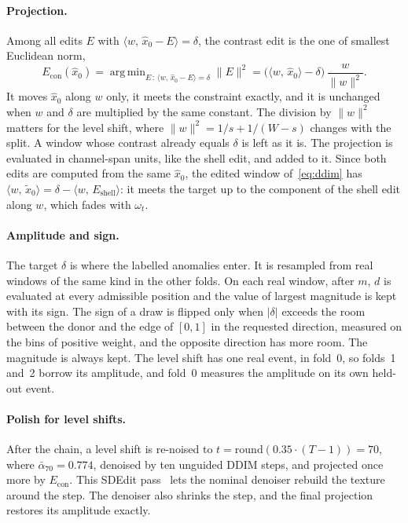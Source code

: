 \documentclass[11pt,a4paper]{article}
\newcommand{\xhat}{\hat{x}_{0}}            %
\newcommand{\xtil}{\tilde{x}_{0}}          %
\newcommand{\abar}{\bar\alpha}
\newcommand{\Eshell}{E_{\mathrm{shell}}}
\newcommand{\Econ}{E_{\mathrm{con}}}
\newcommand{\norm}[1]{\lVert #1 \rVert}
\newcommand{\inner}[2]{\langle #1,\, #2 \rangle}
\DeclareMathOperator*{\argmin}{arg\,min}
\begin{document}
\paragraph{Projection.}
Among all edits $E$ with $\inner{w}{\xhat - E} = \delta$, the contrast edit is
the one of smallest Euclidean norm,
\begin{equation}
\label{eq:contrast}
\Econ(\xhat)
  = \argmin_{E \,:\, \inner{w}{\xhat - E} = \delta} \norm{E}^{2}
  = \bigl(\inner{w}{\xhat} - \delta\bigr)\,
    \frac{w}{\norm{w}^{2}}.
\end{equation}
It moves $\xhat$ along $w$ only, it meets the constraint exactly, and it is
unchanged when $w$ and $\delta$ are multiplied by the same constant. The
division by $\norm{w}^{2}$ matters for the level shift, where
$\norm{w}^{2} = 1/s + 1/(W-s)$ changes with the split. A window whose contrast
already equals $\delta$ is left as it is. The projection is evaluated in
channel-span units, like the shell edit, and added to it. Since both edits are
computed from the same $\xhat$, the edited window of~\eqref{eq:ddim} has
$\inner{w}{\xtil} = \delta - \inner{w}{\Eshell}$: it meets the target up to
the component of the shell edit along $w$, which fades with $\omega_{t}$.

\paragraph{Amplitude and sign.}
The target $\delta$ is where the labelled anomalies enter. It is resampled
from real windows of the same kind in the other folds. On each real window,
after $m$, $d$ is evaluated at every admissible position and the value of
largest magnitude is kept with its sign. The sign of a draw is flipped only
when $\lvert\delta\rvert$ exceeds the room between the donor and the edge of
$[0, 1]$ in the requested direction, measured on the bins of positive weight,
and the opposite direction has more room. The magnitude is always kept. The
level shift has one real event, in fold~0, so folds~1 and~2 borrow its
amplitude, and fold~0 measures the amplitude on its own held-out event.

\paragraph{Polish for level shifts.}
After the chain, a level shift is re-noised to
$t = \mathrm{round}(0.35 \cdot (T - 1)) = 70$, where $\abar_{70} = 0.774$,
denoised by ten unguided DDIM steps, and projected once more by $\Econ$. This
SDEdit pass~\cite{meng2022sdedit} lets the nominal denoiser rebuild the texture
around the step. The denoiser also shrinks the step, and the final projection
restores its amplitude exactly.
\end{document}
